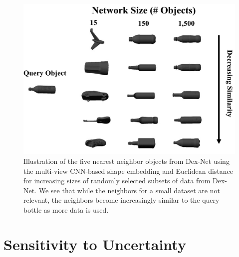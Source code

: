 \begin{figure}[t!]
\centering
\includegraphics[scale=0.075]{figures/bottle_nearest_neighbors.jpg}
\caption{Illustration of the five nearest neighbor objects from Dex-Net using the multi-view CNN-based shape embedding and Euclidean distance for increasing sizes of randomly selected subsets of data from Dex-Net. We see that while the neighbors for a small dataset are not relevant, the neighbors become increasingly similar to the query bottle as more data is used.}
\vspace*{-15pt}
\end{figure}

\section{Sensitivity to Uncertainty}

